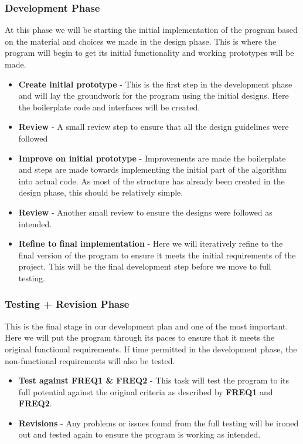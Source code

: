 \documentclass{article}
\begin{document}
\subsubsection{Development Phase}
At this phase we will be starting the initial implementation of the program based on the material and choices we made in the design phase.
This is where the program will begin to get its initial functionality and working prototypes will be made.
\begin{itemize}
    \item \textbf{Create initial prototype} - This is the first step in the development phase and will lay the groundwork for the program
    using the initial designs. Here the boilerplate code and interfaces will be created.
    \item \textbf{Review} - A small review step to ensure that all the design guidelines were followed
    \item \textbf{Improve on initial prototype} - Improvements are made the boilerplate and steps are made towards implementing the initial
    part of the algorithm into actual code. As most of the structure has already been created in the design phase, this should be relatively
    simple.
    \item \textbf{Review} - Another small review to ensure the designs were followed as intended.
    \item \textbf{Refine to final implementation} - Here we will iteratively refine to the final version of the program to ensure it meets
    the initial requirements of the project. This will be the final development step before we move to full testing.
\end{itemize}

\subsubsection{Testing + Revision Phase}
This is the final stage in our development plan and one of the most important. Here we will put the program through its paces to ensure that
it meets the original functional requirements. If time permitted in the development phase, the non-functional requirements will also be
tested.
\begin{itemize}
    \item \textbf{Test against FREQ1 \& FREQ2} - This task will test the program to its full potential against the original criteria as
    described by \textbf{FREQ1} and \textbf{FREQ2}.
    \item \textbf{Revisions} - Any problems or issues found from the full testing will be ironed out and tested again to ensure the program
    is working as intended.
\end{itemize}
\end{document}
